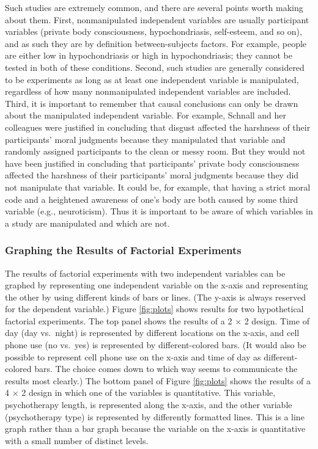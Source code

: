 \documentclass[
]{krantz}
\begin{document}
Such studies are extremely common, and there are several points worth making about them. First, nonmanipulated independent variables are usually participant variables (private body consciousness, hypochondriasis, self-esteem, and so on), and as such they are by definition between-subjects factors. For example, people are either low in hypochondriasis or high in hypochondriasis; they cannot be tested in both of these conditions. Second, such studies are generally considered to be experiments as long as at least one independent variable is manipulated, regardless of how many nonmanipulated independent variables are included. Third, it is important to remember that causal conclusions can only be drawn about the manipulated independent variable. For example, Schnall and her colleagues were justified in concluding that disgust affected the harshness of their participants' moral judgments because they manipulated that variable and randomly assigned participants to the clean or messy room. But they would not have been justified in concluding that participants' private body consciousness affected the harshness of their participants' moral judgments because they did not manipulate that variable. It could be, for example, that having a strict moral code and a heightened awareness of one's body are both caused by some third variable (e.g., neuroticism). Thus it is important to be aware of which variables in a study are manipulated and which are not.

\hypertarget{graphing-the-results-of-factorial-experiments}{%
\subsubsection*{Graphing the Results of Factorial Experiments}\label{graphing-the-results-of-factorial-experiments}}


The results of factorial experiments with two independent variables can be graphed by representing one independent variable on the x-axis and representing the other by using different kinds of bars or lines. (The y-axis is always reserved for the dependent variable.) Figure \ref{fig:plots} shows results for two hypothetical factorial experiments. The top panel shows the results of a 2 × 2 design. Time of day (day vs.~night) is represented by different locations on the x-axis, and cell phone use (no vs.~yes) is represented by different-colored bars. (It would also be possible to represent cell phone use on the x-axis and time of day as different-colored bars. The choice comes down to which way seems to communicate the results most clearly.) The bottom panel of Figure \ref{fig:plots} shows the results of a 4 × 2 design in which one of the variables is quantitative. This variable, psychotherapy length, is represented along the x-axis, and the other variable (psychotherapy type) is represented by differently formatted lines. This is a line graph rather than a bar graph because the variable on the x-axis is quantitative with a small number of distinct levels.
\end{document}

